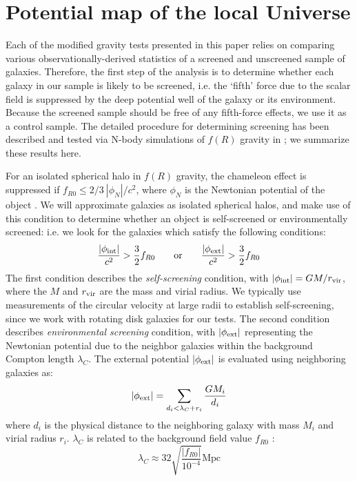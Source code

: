 \documentclass{emulateapj}
\begin{document}
\section{Potential map of the local Universe}
\label{pot-sec}
Each of the modified gravity tests presented in this paper relies on comparing
various observationally-derived statistics of a screened and unscreened sample
of galaxies.
Therefore, the first step of the analysis is to determine whether each
galaxy in our sample is likely to be screened, i.e. the `fifth' force due
to the  scalar field is suppressed by the deep 
potential well of the galaxy or its environment.  
Because the screened sample should be free of any fifth-force effects, we use
it as a control sample.  The detailed procedure for 
determining screening has been described and tested via N-body simulations
of $f(R)$ gravity in \cite{cabre2012}; we summarize these results here.

For an isolated spherical halo in $f(R)$ gravity,
the chameleon effect is suppressed if $f_{R0} \leq 2/3\
|\phi_N|/c^2$, where $\phi_N$ is the Newtonian  potential of the object
\citep{hu07}. We will approximate galaxies as isolated spherical halos,
and make use of this condition to determine whether an
object is self-screened or environmentally screened: i.e. we look for the
galaxies which satisfy the following conditions: 
\begin{equation}
\label{eq:criterion} 
 \frac{|\phi_{\rm int}|}{c^2}>\frac{3}{2} f_{R0}\; \; \; \; \; \; \; \mathrm{or}
\; \; \; \; \; \; \; \frac{|\phi_{\rm ext}|}{c^2}>\frac{3}{2} f_{R0}
\end{equation}
The first condition describes the {\it self-screening} condition, with 
$ |\phi_{\rm int}|= GM/r_{\rm vir}$, where the $M$ and $r_{\rm vir}$ are the
mass and virial radius. We typically use measurements of the circular velocity at large radii to establish self-screening, since we work with rotating disk galaxies for our tests. 
The second condition describes {\it environmental
screening} condition, with $|\phi_{\rm ext}|$ representing the
Newtonian potential due to the neighbor galaxies within the background Compton
length $\lambda_C$.
The external potential $|\phi_{\rm ext}|$ is evaluated using 
neighboring galaxies as:
\begin{equation}\label{eq:criterion22} 
 |\phi_{\rm ext}|= \sum_{d_i<\lambda_C+r_i} \frac{GM_i}{d_i}
\end{equation}
where $d_i$ is the physical distance to the neighboring
galaxy with mass $M_i$ and virial radius $r_i$. $\lambda_C$ is related
to the background field value $f_{R0}$
\citep{sch09}:
\begin{equation}
 \lambda_C \approx 32 \sqrt{\frac{\left|f_{R0}\right|}{10^{-4}}} \mathrm{ Mpc}
 \label{eq:compton}
\end{equation}
\end{document}
